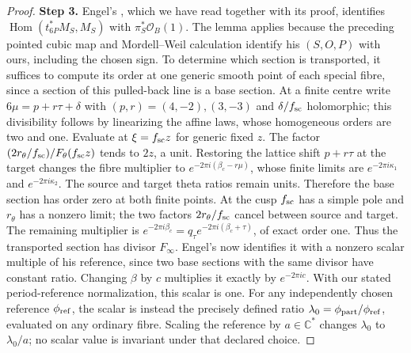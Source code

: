 \documentclass[11pt,a4paper]{article}
\theoremstyle{plain}
\theoremstyle{definition}
\begin{document}
\begin{proof}
\par\smallskip\noindent\textbf{Step 3.} Engel's \cite[Lemma 2.1]{E26}, which we have read together with its proof, identifies $\operatorname{Hom}(t_{6P}^*M_S,M_S)$ with $\pi_S^*\mathcal O_B(1)$. The lemma applies because the preceding pointed cubic map and Mordell--Weil calculation identify his $(S,O,P)$ with ours, including the chosen sign. To determine which section is transported, it suffices to compute its order at one generic smooth point of each special fibre, since a section of this pulled-back line is a base section. At a finite centre write $6\mu=p+r\tau+\delta$ with $(p,r)=(4,-2),(3,-3)$ and $\delta/f_{\rm sc}$ holomorphic; this divisibility follows by linearizing the affine laws, whose homogeneous orders are two and one. Evaluate at $\xi=f_{\rm sc}z$ for generic fixed $z$. The factor $(2r_\theta/f_{\rm sc})/F_\theta(f_{\rm sc}z)$ tends to $2z$, a unit. Restoring the lattice shift $p+r\tau$ at the target changes the fibre multiplier to $e^{-2\pi i(\beta_c-r\mu)}$, whose finite limits are $e^{-2\pi i\kappa_1}$ and $e^{-2\pi i\kappa_2}$. The source and target theta ratios remain units. Therefore the base section has order zero at both finite points. At the cusp $f_{\rm sc}$ has a simple pole and $r_\theta$ has a nonzero limit; the two factors $2r_\theta/f_{\rm sc}$ cancel between source and target. The remaining multiplier is
$e^{-2\pi i\beta_c}=q_\tau e^{-2\pi i(\beta_c+\tau)}$, of exact order one. Thus the transported section has divisor $F_\infty$. Engel's \cite[Corollary 2.2]{E26} now identifies it with a nonzero scalar multiple of his reference, since two base sections with the same divisor have constant ratio. Changing $\beta$ by $c$ multiplies it exactly by $e^{-2\pi ic}$. With our stated period-reference normalization, this scalar is one. For any independently chosen reference $\phi_{\rm ref}$, the scalar is instead the precisely defined ratio $\lambda_0=\phi_{\rm part}/\phi_{\rm ref}$, evaluated on any ordinary fibre. Scaling the reference by $a\in\mathbb C^*$ changes $\lambda_0$ to $\lambda_0/a$; no scalar value is invariant under that declared choice.
\end{proof}
\end{document}
